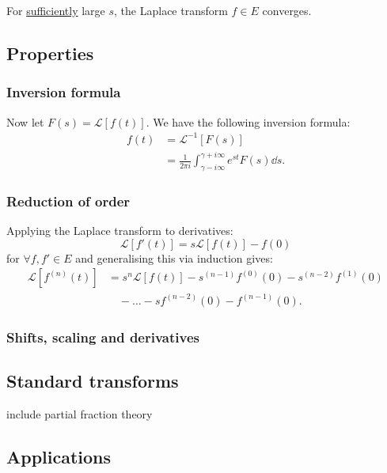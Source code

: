 \documentclass{article}
\begin{document}
For \underline{sufficiently} large $s$, the Laplace transform
$f\in E$ converges.

\subsection{Properties}
\subsubsection{Inversion formula}
Now let $F(s)=\mathcal{L}[f(t)]$. We have
the following inversion formula:
\begin{align*}
    f(t)
    &=\mathcal{L}^{-1}[F(s)] \\
    &=\frac{1}{2\pi i}\int_{\gamma-i\infty}^
    {\gamma+i\infty}e^{st}F(s)\dd s.
\end{align*}

\subsubsection{Reduction of order}
Applying the Laplace transform to derivatives:
$$\mathcal{L}[f'(t)]=s\mathcal{L}[f(t)]-f(0)$$
for $\forall f,f'\in E$ and 
generalising this via induction gives:
\begin{align*}
    \mathcal{L}[f^{(n)}(t)]
    &=s^n\mathcal{L}[f(t)]
    -s^{(n-1)}f^{(0)}(0)-s^{(n-2)}f^{(1)}(0) \\
    &\quad-\dots-sf^{(n-2)}(0)-f^{(n-1)}(0).
\end{align*}

\subsubsection{Shifts, scaling and derivatives}

\subsection{Standard transforms}

include partial fraction theory

\subsection{Applications}
\end{document}
